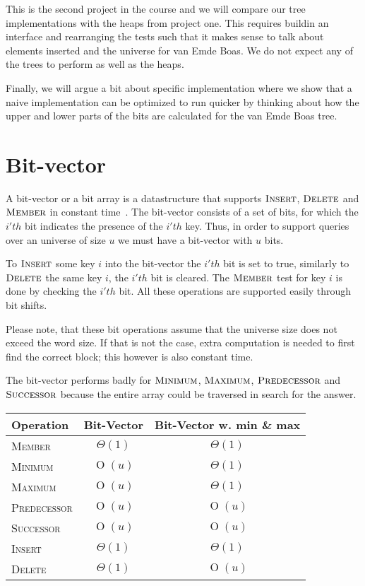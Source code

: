 \documentclass[oneside,11pt,openright]{report}
\newcommand{\BigO}[1]{\ensuremath{\operatorname{O}\left(#1\right)}}
\newcommand{\BigT}[1]{\ensuremath{\Theta\left(#1\right)}}
\newcommand{\Insert}{\textsc{Insert}}
\newcommand{\Delete}{\textsc{Delete}}
\newcommand{\Member}{\textsc{Member}}
\newcommand{\Minimum}{\textsc{Minimum}}
\newcommand{\Maximum}{\textsc{Maximum}}
\newcommand{\Predecessor}{\textsc{Predecessor}}
\newcommand{\Successor}{\textsc{Successor}}
\begin{document}
This is the second project in the course and we will compare our tree implementations with the heaps from project one. This requires buildin an interface and rearranging the tests such that it makes sense to talk about elements inserted and the universe for van Emde Boas. We do not expect any of the trees to perform as well as the heaps.

Finally, we will argue a bit about specific implementation where we show that a naive implementation can be optimized to run quicker by thinking about how the upper and lower parts of the bits are calculated for the van Emde Boas tree.

\chapter{Bit-vector}

A bit-vector or a bit array is a datastructure that supports
$\Insert$, $\Delete$ and $\Member$ in constant
time~\cite[p. 532]{ITA09}. The bit-vector consists of a set of bits,
for which the $i'th$ bit indicates the presence of the
$i'th$ key. Thus, in order to support queries over an universe of size $u$ we must
have a bit-vector with $u$ bits.

To $\Insert$ some key $i$ into the bit-vector the $i'th$ bit is set to
true, similarly to $\Delete$ the same key $i$, the $i'th$ bit is
cleared. The $\Member$ test for key $i$ is done by checking the $i'th$
bit. All these operations are supported easily through bit
shifts. 

Please note, that these bit operations assume that the universe size
does not exceed the word size. If that is not the case, extra
computation is needed to first find the correct block; this however is
also constant time.

The bit-vector performs badly for $\Minimum$, $\Maximum$,
$\Predecessor$ and $\Successor$ because the entire array could be
traversed in search for the answer.

\begin{center}
  \begin{tabular}{ l | c | c}
    Operation & Bit-Vector & Bit-Vector w. min \& max \\ \hline
    \Member & $\BigT{1}$ & $\BigT{1}$ \\ 
    \Minimum & $\BigO{u}$ & $\BigT{1}$ \\ 
    \Maximum & $\BigO{u}$ & $\BigT{1}$ \\ 
    \Predecessor & $\BigO{u}$ & $\BigO{u}$ \\ 
    \Successor & $\BigO{u}$ & $\BigO{u}$ \\ 
    \Insert & $\BigT{1}$ & $\BigT{1}$ \\ 
    \Delete & $\BigT{1}$ & $\BigO{u}$ \\
  \end{tabular}
\end{center}
\end{document}
